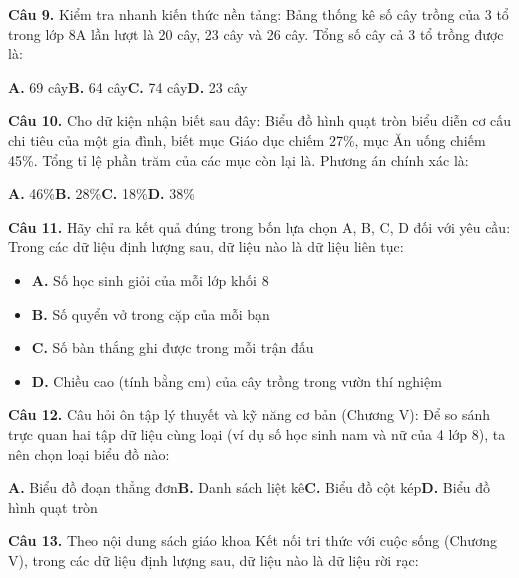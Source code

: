 \documentclass[11pt,a4paper]{article}
\begin{document}
\textbf{\color{primary} Câu 9.} Kiểm tra nhanh kiến thức nền tảng: Bảng thống kê số cây trồng của 3 tổ trong lớp 8A lần lượt là 20 cây, 23 cây và 26 cây. Tổng số cây cả 3 tổ trồng được là:\par
\hspace*{1.5em}\textbf{A.} 69 cây\quad\quad \textbf{B.} 64 cây\quad\quad \textbf{C.} 74 cây\quad\quad \textbf{D.} 23 cây\par\vspace{2pt}
\textbf{\color{primary} Câu 10.} Cho dữ kiện nhận biết sau đây: Biểu đồ hình quạt tròn biểu diễn cơ cấu chi tiêu của một gia đình, biết mục Giáo dục chiếm 27\%, mục Ăn uống chiếm 45\%. Tổng tỉ lệ phần trăm của các mục còn lại là. Phương án chính xác là:\par
\hspace*{1.5em}\textbf{A.} 46\%\quad\quad \textbf{B.} 28\%\quad\quad \textbf{C.} 18\%\quad\quad \textbf{D.} 38\%\par\vspace{2pt}
\textbf{\color{primary} Câu 11.} Hãy chỉ ra kết quả đúng trong bốn lựa chọn A, B, C, D đối với yêu cầu: Trong các dữ liệu định lượng sau, dữ liệu nào là dữ liệu liên tục:\par
\begin{itemize}\setlength{\itemsep}{1pt}\setlength{\parskip}{0pt}
  \item[] \textbf{A.} Số học sinh giỏi của mỗi lớp khối 8
  \item[] \textbf{B.} Số quyển vở trong cặp của mỗi bạn
  \item[] \textbf{C.} Số bàn thắng ghi được trong mỗi trận đấu
  \item[] \textbf{D.} Chiều cao (tính bằng cm) của cây trồng trong vườn thí nghiệm
\end{itemize}\vspace{2pt}
\textbf{\color{primary} Câu 12.} Câu hỏi ôn tập lý thuyết và kỹ năng cơ bản (Chương V): Để so sánh trực quan hai tập dữ liệu cùng loại (ví dụ số học sinh nam và nữ của 4 lớp 8), ta nên chọn loại biểu đồ nào:\par
\hspace*{1.5em}\textbf{A.} Biểu đồ đoạn thẳng đơn\quad\quad \textbf{B.} Danh sách liệt kê\quad\quad \textbf{C.} Biểu đồ cột kép\quad\quad \textbf{D.} Biểu đồ hình quạt tròn\par\vspace{2pt}
\textbf{\color{primary} Câu 13.} Theo nội dung sách giáo khoa Kết nối tri thức với cuộc sống (Chương V), trong các dữ liệu định lượng sau, dữ liệu nào là dữ liệu rời rạc:\par
\end{document}
